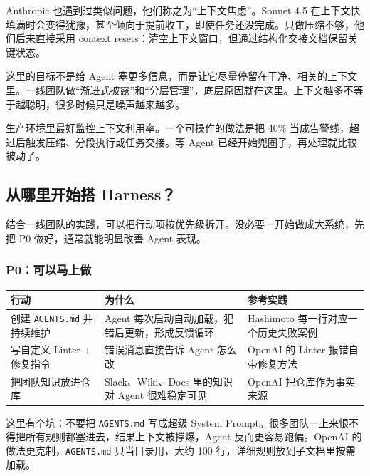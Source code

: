 \documentclass[9pt,a4paper,twocolumn]{ctexart}
\begin{document}
Anthropic 也遇到过类似问题，他们称之为“上下文焦虑”。Sonnet 4.5 在上下文快填满时会变得犹豫，甚至倾向于提前收工，即使任务还没完成。只做压缩不够，他们后来直接采用 context resets：清空上下文窗口，但通过结构化交接文档保留关键状态。



这里的目标不是给 Agent 塞更多信息，而是让它尽量停留在干净、相关的上下文里。一线团队做“渐进式披露”和“分层管理”，底层原因就在这里。上下文越多不等于越聪明，很多时候只是噪声越来越多。



生产环境里最好监控上下文利用率。一个可操作的做法是把 40\% 当成告警线，超过后触发压缩、分段执行或任务交接。等 Agent 已经开始兜圈子，再处理就比较被动了。



\subsection*{从哪里开始搭 Harness？}


结合一线团队的实践，可以把行动项按优先级拆开。没必要一开始做成大系统，先把 P0 做好，通常就能明显改善 Agent 表现。



\subsubsection{P0：可以马上做}

{\footnotesize
\begin{tabular}{|p{}|p{}|p{}|}
\hline
\textbf{行动} & \textbf{为什么} & \textbf{参考实践} \\
\hline
创建 \texttt{AGENTS.md} 并持续维护 & Agent 每次启动自动加载，犯错后更新，形成反馈循环 & Hashimoto 每一行对应一个历史失败案例 \\
\hline
写自定义 Linter + 修复指令 & 错误消息直接告诉 Agent 怎么改 & OpenAI 的 Linter 报错自带修复方法 \\
\hline
把团队知识放进仓库 & Slack、Wiki、Docs 里的知识对 Agent 很难稳定可见 & OpenAI 把仓库作为事实来源 \\
\hline
\end{tabular}
}



这里有个坑：不要把 \texttt{AGENTS.md} 写成超级 System Prompt。很多团队一上来恨不得把所有规则都塞进去，结果上下文被撑爆，Agent 反而更容易跑偏。OpenAI 的做法更克制，\texttt{AGENTS.md} 只当目录用，大约 100 行，详细规则放到子文档里按需加载。
\end{document}
